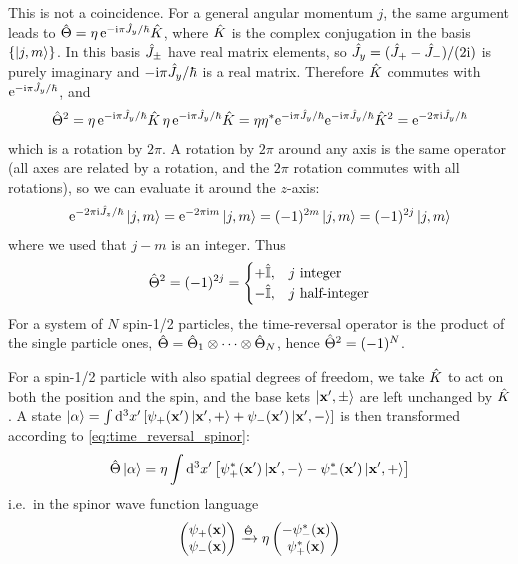 This is not a coincidence. For a general angular momentum $j$, the same argument leads to $\hat{\Theta} = \eta \, \mathrm{e}^{-\mathrm{i} \pi \hat{J}_y / \hbar} \hat{K}$, where $\hat{K}$ is the complex conjugation in the basis $\{\ket{j,m}\}$. In this basis $\hat{J}_\pm$ have real matrix elements, so $\hat{J}_y = (\hat{J}_+ - \hat{J}_-)/(2\mathrm{i})$ is purely imaginary and $- \mathrm{i} \pi \hat{J}_y / \hbar$ is a real matrix. Therefore $\hat{K}$ commutes with $\mathrm{e}^{-\mathrm{i} \pi \hat{J}_y / \hbar}$, and
\begin{align*}
    \hat{\Theta}^2 = \eta \, \mathrm{e}^{-\mathrm{i} \pi \hat{J}_y / \hbar} \hat{K} \, \eta \, \mathrm{e}^{-\mathrm{i} \pi \hat{J}_y / \hbar} \hat{K} = \eta \eta^* \mathrm{e}^{-\mathrm{i} \pi \hat{J}_y / \hbar} \mathrm{e}^{-\mathrm{i} \pi \hat{J}_y / \hbar} \hat{K}^2 = \mathrm{e}^{-2 \pi \mathrm{i} \hat{J}_y / \hbar}
\end{align*}
which is a rotation by $2\pi$. A rotation by $2\pi$ around any axis is the same operator (all axes are related by a rotation, and the $2\pi$ rotation commutes with all rotations), so we can evaluate it around the $z$-axis:
\begin{align*}
    \mathrm{e}^{-2 \pi \mathrm{i} \hat{J}_z / \hbar} \ket{j,m} = \mathrm{e}^{-2 \pi \mathrm{i} m} \ket{j,m} = (-1)^{2m} \ket{j,m} = (-1)^{2j} \ket{j,m}
\end{align*}
where we used that $j - m$ is an integer. Thus
\begin{align}
    \hat{\Theta}^2 = (-1)^{2j} = \begin{cases} + \hat{\mathbb{I}}, & j \text{ integer} \\ - \hat{\mathbb{I}}, & j \text{ half-integer} \end{cases} \label{eq:theta_square_general}
\end{align}
For a system of $N$ spin-1/2 particles, the time-reversal operator is the product of the single particle ones, $\hat{\Theta} = \hat{\Theta}_1 \otimes \cdots \otimes \hat{\Theta}_N$, hence $\hat{\Theta}^2 = (-1)^N$.

For a spin-1/2 particle with also spatial degrees of freedom, we take $\hat{K}$ to act on both the position and the spin, and the base kets $\ket{\mathbf{x}', \pm}$ are left unchanged by $\hat{K}$. A state $\ket{\alpha} = \int \mathrm{d}^3 x' \left[ \psi_+(\mathbf{x}') \ket{\mathbf{x}',+} + \psi_-(\mathbf{x}') \ket{\mathbf{x}',-} \right]$ is then transformed according to \cref{eq:time_reversal_spinor}:
\begin{align*}
    \hat{\Theta} \ket{\alpha} = \eta \int \mathrm{d}^3 x' \left[ \psi_+^*(\mathbf{x}') \ket{\mathbf{x}',-} - \psi_-^*(\mathbf{x}') \ket{\mathbf{x}',+} \right]
\end{align*}
i.e.\ in the spinor wave function language
\begin{align*}
    \begin{pmatrix} \psi_+(\mathbf{x}) \\ \psi_-(\mathbf{x}) \end{pmatrix} \xrightarrow{\hat{\Theta}} \eta \begin{pmatrix} - \psi_-^*(\mathbf{x}) \\ \psi_+^*(\mathbf{x}) \end{pmatrix}
\end{align*}

